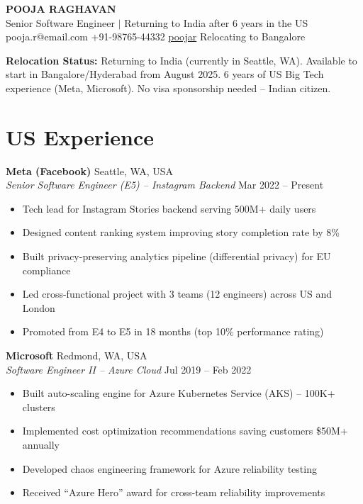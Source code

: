 \documentclass[10pt,letterpaper]{article}
\begin{document}
\begin{center}
{\LARGE\bfseries\color{intblue} POOJA RAGHAVAN}\\[4pt]
{\normalsize Senior Software Engineer $\vert$ Returning to India after 6 years in the US}\\[6pt]
{\small {} pooja.r@email.com \quad {} +91-98765-44332 \quad {} \href{https://linkedin.com/in/poojar}{poojar} \quad {} Relocating to Bangalore}
\end{center}

\vspace{4pt}
\begin{tcolorbox}
\hspace{4pt}\textbf{Relocation Status:} Returning to India (currently in Seattle, WA). Available to start in Bangalore/Hyderabad from August 2025. 6 years of US Big Tech experience (Meta, Microsoft). No visa sponsorship needed -- Indian citizen.
\end{tcolorbox}

\section{US Experience}

\textbf{Meta (Facebook)} \hfill Seattle, WA, USA\\
\textit{Senior Software Engineer (E5) -- Instagram Backend} \hfill Mar 2022 -- Present
\begin{itemize}
\item Tech lead for Instagram Stories backend serving 500M+ daily users
\item Designed content ranking system improving story completion rate by 8\%
\item Built privacy-preserving analytics pipeline (differential privacy) for EU compliance
\item Led cross-functional project with 3 teams (12 engineers) across US and London
\item Promoted from E4 to E5 in 18 months (top 10\% performance rating)
\end{itemize}

\textbf{Microsoft} \hfill Redmond, WA, USA\\
\textit{Software Engineer II -- Azure Cloud} \hfill Jul 2019 -- Feb 2022
\begin{itemize}
\item Built auto-scaling engine for Azure Kubernetes Service (AKS) -- 100K+ clusters
\item Implemented cost optimization recommendations saving customers \$50M+ annually
\item Developed chaos engineering framework for Azure reliability testing
\item Received ``Azure Hero'' award for cross-team reliability improvements
\end{itemize}
\end{document}
